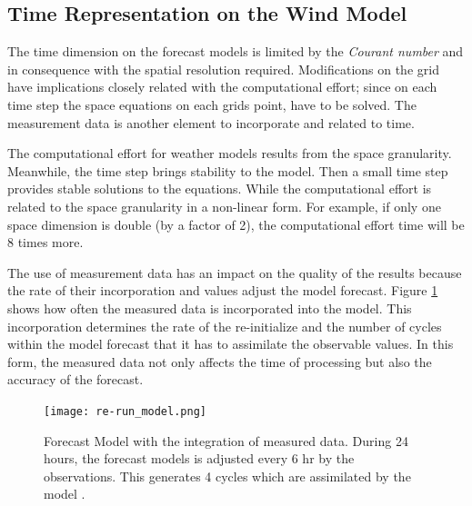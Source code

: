 \subsection{Time Representation on the Wind Model}
The time dimension on the forecast models is limited by the \textit{Courant number} and in consequence with the spatial resolution required. Modifications on the grid have implications closely related with the computational effort; since on each time step the space equations on each grids point, have to be solved. The measurement data is another element to incorporate and related to time. \par 

The computational effort for weather models results from the space granularity. Meanwhile, the time step brings stability to the model. Then a small time step provides stable solutions to the equations. 
While the computational effort is related to the space granularity in a non-linear form. For example, if only one space dimension is double (by a factor of 2), the computational effort time will be 8 times more. \par 
The use of measurement data has an impact on the quality of the results because the rate of their incorporation and values adjust the model forecast. Figure \ref{fig:data_meas_integration} shows how often the measured data is incorporated into the model. This incorporation determines the rate of the re-initialize and the number of cycles %
within the model forecast that it has to assimilate the observable values. %
In this form, the measured data %
not only affects the time of processing but also the accuracy of the forecast. \par %
\begin{figure}
    \centering
    \texttt{[image: re-run\_model.png]}
    \caption{Forecast Model with the integration of measured data. During 24 hours, the forecast models is adjusted every 6 hr by the observations. This generates 4 cycles which are assimilated by the model \cite{warner2010numerical}. }
    \label{fig:data_meas_integration}
\end{figure}


